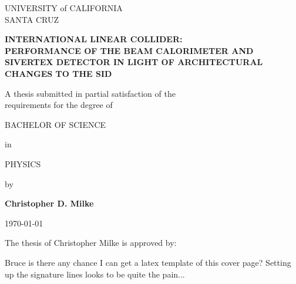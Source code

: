 \documentclass{report}
\begin{document}
	\begin{titlepage} \begin{singlespace}
        \begin{center} \begin{large}
            UNIVERSITY of CALIFORNIA \\ SANTA CRUZ

            \vspace{\baselineskip}

            \textbf{INTERNATIONAL LINEAR COLLIDER: \\ PERFORMANCE OF THE BEAM CALORIMETER AND SIVERTEX DETECTOR  IN LIGHT OF ARCHITECTURAL CHANGES TO THE SID}

            \vspace{\baselineskip}

            A thesis submitted in partial satisfaction of the \\ requirements for the degree of

            \vspace{\baselineskip}

            BACHELOR OF SCIENCE

            \vspace{\baselineskip}

            in

            \vspace{\baselineskip}

            PHYSICS

            \vspace{\baselineskip}

            by

            \vspace{\baselineskip}

            \textbf{Christopher D. Milke}

            \vspace{\baselineskip}

            \today

            \vspace*{\fill}

            \end{large}

            The thesis of Christopher Milke is approved by:
        \end{center}

        Bruce is there any chance I can get a latex template of this cover page? Setting up the signature lines looks to be quite the pain...
	\end{singlespace} \end{titlepage}
\end{document}
